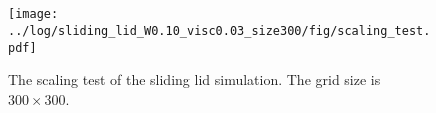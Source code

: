 \subsection{}
\begin{figure}
  \centering
  \texttt{[image: ../log/sliding\_lid\_W0.10\_visc0.03\_size300/fig/scaling\_test.pdf]}
  \caption{The scaling test of the sliding lid simulation. The grid size is $300 \times 300$.}
  \label{fig:sliding-lid-scaling}
\end{figure}

